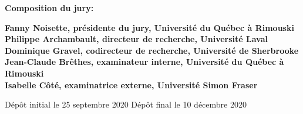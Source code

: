 \thispagestyle{empty}

\null
\vfill
\noindent \textbf{Composition du jury:}\\
\vspace{1cm}

\begin{singlespace}
  \noindent \textbf{Fanny Noisette, présidente du jury, Université du Québec à Rimouski}\\

  \noindent \textbf{Philippe Archambault, directeur de recherche, Université Laval}\\

  \noindent \textbf{Dominique Gravel, codirecteur de recherche, Université de Sherbrooke}\\

  \noindent \textbf{Jean-Claude Brêthes, examinateur interne, Université du Québec à Rimouski}\\

  \noindent \textbf{Isabelle Côté, examinatrice externe, Université Simon Fraser}\\
\end{singlespace}

\vspace{2cm}
\noindent Dépôt initial le 25 septembre 2020
\hspace{3cm}
\noindent Dépôt final le 10 décembre 2020


\cleardoublepage
